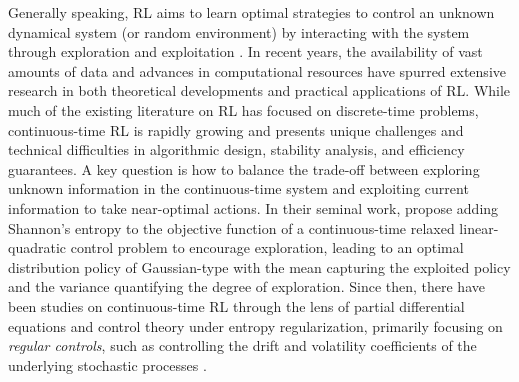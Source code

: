 \documentclass[11pt]{amsart}
\theoremstyle{plain}
\numberwithin{equation}{section}
\begin{document}
Generally speaking, RL aims to learn optimal strategies to control an unknown dynamical system (or random environment) by
interacting with the system through exploration and exploitation \cite{sutton2018reinforcement}.  
In recent years, the availability of vast amounts of data and advances in computational resources have spurred extensive research in both theoretical developments and practical applications of RL. 
While much of the existing literature on RL has focused on discrete-time problems, 
continuous-time RL is rapidly growing and presents unique challenges and technical difficulties in algorithmic design, stability analysis, and efficiency guarantees. 
A key question is how to balance the trade-off between exploring unknown information in the continuous-time system and exploiting current information to take near-optimal actions. 
In their seminal work, \cite{wang2020reinforcement} propose adding Shannon's entropy to the objective function of a continuous-time relaxed linear-quadratic control problem to encourage exploration, leading to an optimal distribution policy of Gaussian-type with the mean capturing the exploited policy and the variance quantifying the degree of exploration. 
Since then, there have been studies on continuous-time RL through the lens of partial differential equations and control theory under entropy regularization, primarily focusing on {\it regular controls}, such as controlling the drift and volatility coefficients of the underlying stochastic processes \cite{bai2023reinforcement,huang2022convergence,jia2022policy,jia2023q,ma2024convergence,tang2022exploratory,tran2024policy,wang2020reinforcement}.
\end{document}
